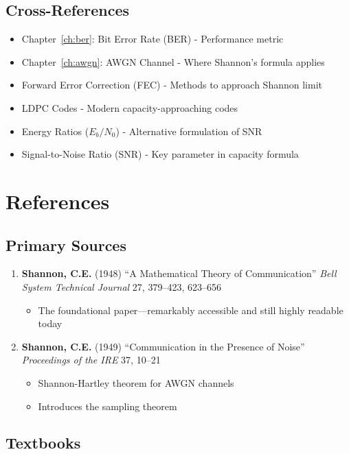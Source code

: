 \subsection{Cross-References}

\begin{itemize}
\item Chapter~\ref{ch:ber}: Bit Error Rate (BER) - Performance metric
\item Chapter~\ref{ch:awgn}: AWGN Channel - Where Shannon's formula applies
\item Forward Error Correction (FEC) - Methods to approach Shannon limit
\item LDPC Codes - Modern capacity-approaching codes
\item Energy Ratios ($E_b/N_0$) - Alternative formulation of SNR
\item Signal-to-Noise Ratio (SNR) - Key parameter in capacity formula
\end{itemize}

\section{References}

\subsection{Primary Sources}

\begin{enumerate}
\item \textbf{Shannon, C.E.} (1948) ``A Mathematical Theory of Communication'' \textit{Bell System Technical Journal} 27, 379--423, 623--656
  \begin{itemize}
  \item The foundational paper---remarkably accessible and still highly readable today
  \end{itemize}

\item \textbf{Shannon, C.E.} (1949) ``Communication in the Presence of Noise'' \textit{Proceedings of the IRE} 37, 10--21
  \begin{itemize}
  \item Shannon-Hartley theorem for AWGN channels
  \item Introduces the sampling theorem
  \end{itemize}
\end{enumerate}

\subsection{Textbooks}

